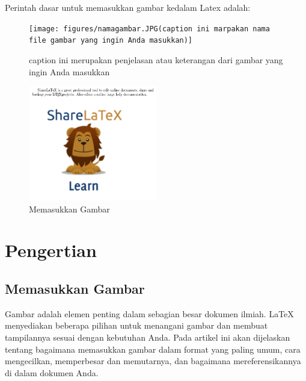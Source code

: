 Perintah dasar untuk memasukkan gambar kedalam Latex adalah:
\begin{figure}[ht]
\centerline{\texttt{[image: figures/namagambar.JPG(caption ini marpakan nama file gambar yang ingin Anda masukkan)]}}
\caption {caption ini merupakan penjelasan atau keterangan dari gambar yang ingin Anda masukkan}
\label{labelgambar}
\end{figure}


\begin{figure}[ht]
	\centerline{\includegraphics[width=0.50\textwidth]{gambar/dapi13.jpg}}
	\caption{Memasukkan Gambar}
	\label{Memasukkan Gambar}
\end{figure}

\section {Pengertian }
\subsection {Memasukkan Gambar}
{\fontsize{10pt}{10pt}\selectfont  \hspace*{0.64in} Gambar adalah elemen penting dalam sebagian besar dokumen ilmiah. LaTeX menyediakan beberapa pilihan untuk menangani gambar dan membuat tampilannya sesuai dengan kebutuhan Anda. Pada artikel ini akan dijelaskan tentang  bagaimana memasukkan gambar dalam format yang paling umum, cara mengecilkan, memperbesar dan memutarnya, dan bagaimana mereferensikannya di dalam dokumen Anda.} \par

